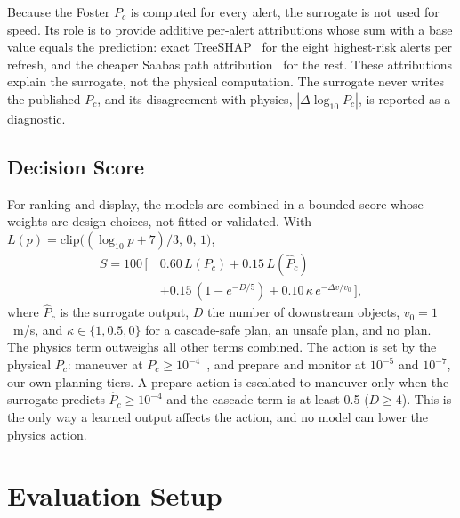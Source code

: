 \documentclass[conference]{IEEEtran}
\newcommand{\Pc}{P_c}
\begin{document}
Because the Foster $\Pc$ is computed for every alert, the surrogate is not used
for speed. Its role is to provide additive per-alert attributions whose sum with
a base value equals the prediction: exact TreeSHAP~\cite{lundberg2020} for the
eight highest-risk alerts per refresh, and the cheaper Saabas path
attribution~\cite{lundberg2020} for the rest. These attributions explain the
surrogate, not the physical computation. The surrogate never writes the
published $\Pc$, and its disagreement with physics, $|\Delta\log_{10}\Pc|$, is
reported as a diagnostic.

\subsection{Decision Score}

For ranking and display, the models are combined in a bounded score whose
weights are design choices, not fitted or validated. With
$L(p)=\mathrm{clip}\big((\log_{10}p+7)/3,\,0,\,1\big)$,
\begin{equation}
\begin{aligned}
  S = 100\,\big[\,&0.60\,L(\Pc)+0.15\,L(\hat P_c)\\
  &+0.15\,(1-e^{-D/5})+0.10\,\kappa\,e^{-\Delta v/v_0}\,\big],
\end{aligned}
\label{eq:score}
\end{equation}
where $\hat P_c$ is the surrogate output, $D$ the number of downstream objects,
$v_0=1$~m/s, and $\kappa\in\{1,0.5,0\}$ for a cascade-safe plan, an unsafe
plan, and no plan. The physics term outweighs all other terms combined. The
action is set by the physical $\Pc$: maneuver at $\Pc\ge10^{-4}$~\cite{nasa2020},
and prepare and monitor at $10^{-5}$ and $10^{-7}$, our own planning tiers. A
prepare action is escalated to maneuver only when the surrogate predicts
$\hat P_c\ge10^{-4}$ and the cascade term is at least 0.5 ($D\ge4$). This is the
only way a learned output affects the action, and no model can lower the
physics action.

\section{Evaluation Setup}
\label{sec:setup}
\end{document}
